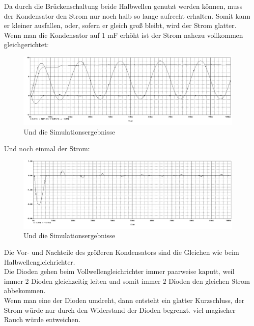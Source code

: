 Da durch die Brückenschaltung beide Halbwellen genutzt werden können, muss der Kondensator den Strom nur noch halb so lange aufrecht erhalten. Somit kann er kleiner ausfallen, oder, sofern er gleich groß bleibt, wird der Strom glatter.
Wenn man die Kondensator auf 1 mF erhöht ist der Strom nahezu vollkommen gleichgerichtet:
\begin{figure}[H]
	\centering
	\includegraphics[width=\linewidth]{versuch2/spice/v2_6_2_simulation.png}
	\caption{Und die Simulationsergebnisse}
\end{figure}
Und noch einmal der Strom:
\begin{figure}[H]
	\centering
	\includegraphics[width=\linewidth]{versuch2/spice/v2_6_2_strom_simulation.png}
	\caption{Und die Simulationsergebnisse}
\end{figure}
Die Vor- und Nachteile des größeren Kondensators sind die Gleichen wie beim Halbwellengleichrichter.\\
Die Dioden gehen beim Vollwellengleichrichter immer paarweise kaputt, weil immer 2 Dioden gleichzeitig leiten und somit immer 2 Dioden den gleichen Strom abbekommen.\\
Wenn man eine der Dioden umdreht, dann entsteht ein glatter Kurzschluss, der Strom würde nur durch den Widerstand der Dioden begrenzt. \textrightarrow viel magischer Rauch würde entweichen.

